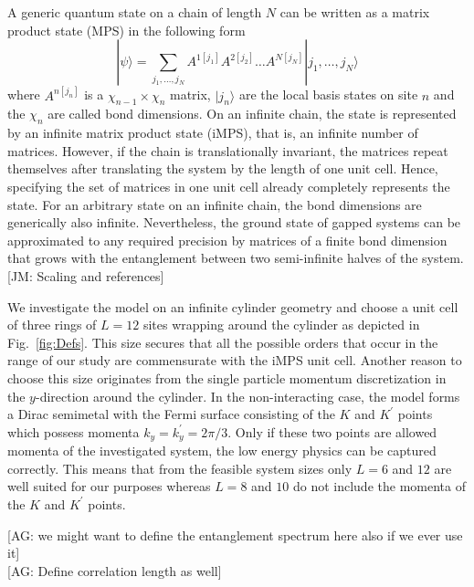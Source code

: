\documentclass[aps,prx,10pt,twocolumn,floatfix,superscriptaddress,showpacs,numerical,footinbib]{revtex4-1}
\newcommand{\ket}[1]{| #1 \rangle}
\newcommand{\noteAG}[1]{{\color{blue} [AG: #1]}}
\newcommand{\noteJM}[1]{{\color{red} [JM: #1]}}
\begin{document}
A generic quantum state on a chain of length $N$ can be written as a matrix product state (MPS) in the following form
\begin{equation}
 \ket{\psi} = \sum_{j_1, \ldots, j_N} A^{1 \left[j_1\right]} A^{2 \left[j_2\right]} \ldots A^{N \left[j_N\right]} \ket{j_1, \ldots, j_N}
\end{equation}
where $A^{n \left[j_n\right]}$ is a $\chi_{n-1} \times \chi_n$ matrix, $\ket{j_n}$ are the local basis states on site $n$ and the $\chi_n$ are called bond dimensions. On an infinite chain, the state is represented by an infinite matrix product state (iMPS), that is, an infinite number of matrices. However, if the chain is translationally invariant, the matrices repeat themselves after translating the system by the length of one unit cell. Hence, specifying the set of matrices in one unit cell already completely represents the state. For an arbitrary state on an infinite chain, the bond dimensions are generically also infinite. Nevertheless, the ground state of gapped systems can be approximated to any required precision by matrices of a finite bond dimension that grows with the entanglement between two semi-infinite halves of the system. \noteJM{Scaling and references}

We investigate the model on an infinite cylinder geometry and choose a unit cell of three rings of $L=12$ sites wrapping around the cylinder as depicted in Fig.~\ref{fig:Defs}. This size secures that all the possible orders that occur in the range of our study are commensurate with the iMPS unit cell. Another reason to choose this size originates from the single particle momentum discretization in the $y$-direction around the cylinder. In the non-interacting case, the model forms a Dirac semimetal with the Fermi surface consisting of the $K$ and $K^{\prime}$ points which possess momenta $k_y=k_y^{\prime} = 2\pi / 3$. Only if these two points are allowed momenta of the investigated system, the low energy physics can be captured correctly. This means that from the feasible system sizes only $L=6$ and $12$ are well suited for our purposes whereas $L=8$ and $10$ do not include the momenta of the $K$ and $K^{\prime}$ points.
%



\noteAG{we might want to define the entanglement spectrum here also if we ever use it}\\
\noteAG{Define correlation length as well}
%
\end{document}
